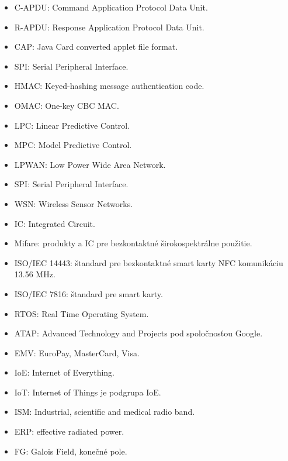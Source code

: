 \documentclass[12pt,a4wide,oneside,openright]{report}
\begin{document}
\begin{itemize}
	\item C-APDU: Command Application Protocol Data Unit.
	\item R-APDU: Response Application Protocol Data Unit.
	\item CAP: Java Card converted applet file format.
	\item SPI: Serial Peripheral Interface.
	\item HMAC: Keyed-hashing message authentication code.
	\item OMAC: One-key CBC MAC.
	\item LPC: Linear Predictive Control.
	\item MPC: Model Predictive Control.
	\item LPWAN: Low Power Wide Area Network.
	\item SPI: Serial Peripheral Interface.	
	\item WSN: Wireless Sensor Networks.
	\item IC: Integrated Circuit.
	\item Mifare: produkty a IC pre bezkontaktné širokospektrálne použitie.
	\item ISO/IEC 14443: štandard pre bezkontaktné smart karty NFC komunikáciu 13.56 MHz.
	\item ISO/IEC 7816: štandard pre smart karty.
	\item RTOS: Real Time Operating System.
	\item ATAP: Advanced Technology and Projects pod spoločnosťou Google.
	\item EMV: EuroPay, MasterCard, Visa.
	\item IoE: Internet of Everything.
	\item IoT: Internet of Things je podgrupa IoE.
	\item ISM: Industrial, scientific and medical radio band.
	\item ERP: effective radiated power.
	\item FG: Galois Field, konečné pole.
\end{itemize}
\onehalfspacing

\listoffigures
\listoftables
\end{document}
